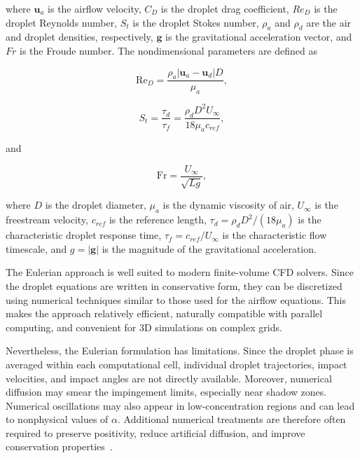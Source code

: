 where $\boldsymbol{u}_a$ is the airflow velocity, $C_D$ is the droplet drag coefficient, $Re_D$ is the droplet Reynolds number, $S_t$ is the droplet Stokes number, $\rho_a$ and $\rho_d$ are the air and droplet densities, respectively, $\boldsymbol{g}$ is the gravitational acceleration vector, and $Fr$ is the Froude number. The nondimensional parameters are defined as

\begin{equation}
\mathrm{Re}_D =
\frac{\rho_a \left| \boldsymbol{u}_a - \boldsymbol{u}_d \right| D}{\mu_a},
\label{eq:reynoldsDroplet}
\end{equation}

\begin{equation}
S_t =
\frac{\tau_d}{\tau_f}
=
\frac{\rho_d D^2 U_\infty}{18 \mu_a c_{ref}},
\label{eq:dropletInertia}
\end{equation}

and

\begin{equation}
\mathrm{Fr} =
\frac{U_{\infty}}{\sqrt{L g}},
\label{eq:froudeDroplet}
\end{equation}

where $D$ is the droplet diameter, $\mu_a$ is the dynamic viscosity of air, $U_\infty$ is the freestream velocity, $c_{ref}$ is the reference length, $\tau_d=\rho_d D^2/(18\mu_a)$ is the characteristic droplet response time, $\tau_f=c_{ref}/U_\infty$ is the characteristic flow timescale, and $g=|\boldsymbol{g}|$ is the magnitude of the gravitational acceleration.

The Eulerian approach is well suited to modern finite-volume CFD solvers. Since the droplet equations are written in conservative form, they can be discretized using numerical techniques similar to those used for the airflow equations. This makes the approach relatively efficient, naturally compatible with parallel computing, and convenient for 3D simulations on complex grids.

Nevertheless, the Eulerian formulation has limitations. Since the droplet phase is averaged within each computational cell, individual droplet trajectories, impact velocities, and impact angles are not directly available. Moreover, numerical diffusion may smear the impingement limits, especially near shadow zones. Numerical oscillations may also appear in low-concentration regions and can lead to nonphysical values of $\alpha$. Additional numerical treatments are therefore often required to preserve positivity, reduce artificial diffusion, and improve conservation properties~\cite{JUNG2013459,blanchet2022conservative}.

